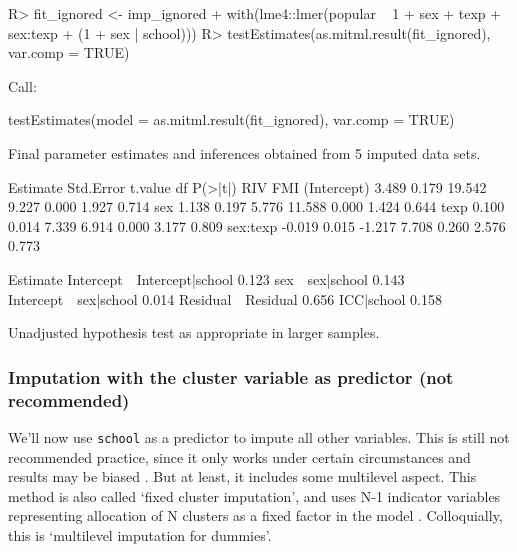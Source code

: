 \documentclass[
]{jss}
\begin{document}
\begin{CodeChunk}
\begin{CodeInput}
R> fit_ignored <- imp_ignored %
+   with(lme4::lmer(popular ~ 1 + sex + texp + sex:texp + (1 + sex | school))) 
R> testEstimates(as.mitml.result(fit_ignored), var.comp = TRUE)
\end{CodeInput}
\begin{CodeOutput}

Call:

testEstimates(model = as.mitml.result(fit_ignored), var.comp = TRUE)

Final parameter estimates and inferences obtained from 5 imputed data sets.

             Estimate Std.Error   t.value        df   P(>|t|)       RIV       FMI 
(Intercept)     3.489     0.179    19.542     9.227     0.000     1.927     0.714 
sex             1.138     0.197     5.776    11.588     0.000     1.424     0.644 
texp            0.100     0.014     7.339     6.914     0.000     3.177     0.809 
sex:texp       -0.019     0.015    -1.217     7.708     0.260     2.576     0.773 

                            Estimate 
Intercept~~Intercept|school    0.123 
sex~~sex|school                0.143 
Intercept~~sex|school          0.014 
Residual~~Residual             0.656 
ICC|school                     0.158 

Unadjusted hypothesis test as appropriate in larger samples.
\end{CodeOutput}
\end{CodeChunk}

\hypertarget{imputation-with-the-cluster-variable-as-predictor-not-recommended}{%
\subsubsection{Imputation with the cluster variable as predictor (not
recommended)}\label{imputation-with-the-cluster-variable-as-predictor-not-recommended}}

We'll now use \texttt{school} as a predictor to impute all other
variables. This is still not recommended practice, since it only works
under certain circumstances and results may be biased
\citep{drec15, ende16}. But at least, it includes some multilevel
aspect. This method is also called `fixed cluster imputation', and uses
N-1 indicator variables representing allocation of N clusters as a fixed
factor in the model \citep{reit06, ende16}. Colloquially, this is
`multilevel imputation for dummies'.
\end{document}
